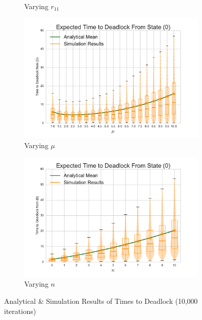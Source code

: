 \documentclass{article}
\begin{document}
\begin{figure}[!htbp]
\begin{subfigure}[b]{0.5\textwidth}
  \caption{Varying $r_{11}$}
  \label{fig:timestodeadlock_r11}
\end{subfigure}
\begin{subfigure}[b]{0.5\textwidth}
  \includegraphics[width=\textwidth]{images/varymu}
  \caption{Varying $\mu$}
  \label{fig:timestodeadlock_mu}
\end{subfigure}
\begin{subfigure}[b]{0.5\textwidth}
  \includegraphics[width=\textwidth]{images/varyn}
  \caption{Varying $n$}
  \label{fig:timestodeadlock_n}
\end{subfigure}
\caption{Analytical \& Simulation Results of Times to Deadlock (10,000 iterations)}
\label{fig:timestodeadlock}
\end{figure}
\end{document}
